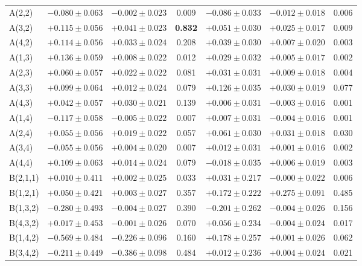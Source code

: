 \begin{table}[tbp]
\begin{tabular}{l ccc ccc}
A(2,2) & $-0.080\!\pm\!0.063$ & $-0.002\!\pm\!0.023$ & 0.009 & $-0.086\!\pm\!0.033$ & $-0.012\!\pm\!0.018$ & 0.006 \\
A(3,2) & $+0.115\!\pm\!0.056$ & $+0.041\!\pm\!0.023$ & \textbf{0.832} & $+0.051\!\pm\!0.030$ & $+0.025\!\pm\!0.017$ & 0.009 \\
A(4,2) & $+0.114\!\pm\!0.056$ & $+0.033\!\pm\!0.024$ & 0.208 & $+0.039\!\pm\!0.030$ & $+0.007\!\pm\!0.020$ & 0.003 \\
A(1,3) & $+0.136\!\pm\!0.059$ & $+0.008\!\pm\!0.022$ & 0.012 & $+0.029\!\pm\!0.032$ & $+0.005\!\pm\!0.017$ & 0.002 \\
A(2,3) & $+0.060\!\pm\!0.057$ & $+0.022\!\pm\!0.022$ & 0.081 & $+0.031\!\pm\!0.031$ & $+0.009\!\pm\!0.018$ & 0.004 \\
A(3,3) & $+0.099\!\pm\!0.064$ & $+0.012\!\pm\!0.024$ & 0.079 & $+0.126\!\pm\!0.035$ & $+0.030\!\pm\!0.019$ & 0.077 \\
A(4,3) & $+0.042\!\pm\!0.057$ & $+0.030\!\pm\!0.021$ & 0.139 & $+0.006\!\pm\!0.031$ & $-0.003\!\pm\!0.016$ & 0.001 \\
A(1,4) & $-0.117\!\pm\!0.058$ & $-0.005\!\pm\!0.022$ & 0.007 & $+0.007\!\pm\!0.031$ & $-0.004\!\pm\!0.016$ & 0.001 \\
A(2,4) & $+0.055\!\pm\!0.056$ & $+0.019\!\pm\!0.022$ & 0.057 & $+0.061\!\pm\!0.030$ & $+0.031\!\pm\!0.018$ & 0.030 \\
A(3,4) & $-0.055\!\pm\!0.056$ & $+0.004\!\pm\!0.020$ & 0.007 & $+0.012\!\pm\!0.031$ & $+0.001\!\pm\!0.016$ & 0.002 \\
A(4,4) & $+0.109\!\pm\!0.063$ & $+0.014\!\pm\!0.024$ & 0.079 & $-0.018\!\pm\!0.035$ & $+0.006\!\pm\!0.019$ & 0.003 \\
B(2,1,1) & $+0.010\!\pm\!0.411$ & $+0.002\!\pm\!0.025$ & 0.033 & $+0.031\!\pm\!0.217$ & $-0.000\!\pm\!0.022$ & 0.006 \\
B(1,2,1) & $+0.050\!\pm\!0.421$ & $+0.003\!\pm\!0.027$ & 0.357 & $+0.172\!\pm\!0.222$ & $+0.275\!\pm\!0.091$ & 0.485 \\
B(1,3,2) & $-0.280\!\pm\!0.493$ & $-0.004\!\pm\!0.027$ & 0.390 & $-0.201\!\pm\!0.262$ & $-0.004\!\pm\!0.026$ & 0.156 \\
B(4,3,2) & $+0.017\!\pm\!0.453$ & $-0.001\!\pm\!0.026$ & 0.070 & $+0.056\!\pm\!0.234$ & $-0.004\!\pm\!0.024$ & 0.017 \\
B(1,4,2) & $-0.569\!\pm\!0.484$ & $-0.226\!\pm\!0.096$ & 0.160 & $+0.178\!\pm\!0.257$ & $+0.001\!\pm\!0.026$ & 0.062 \\
B(3,4,2) & $-0.211\!\pm\!0.449$ & $-0.386\!\pm\!0.098$ & 0.484 & $+0.012\!\pm\!0.236$ & $+0.004\!\pm\!0.024$ & 0.021 \\
\bottomrule
\end{tabular}
\end{table}


